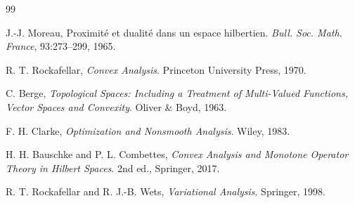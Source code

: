 \documentclass[11pt,a4paper]{article}
\begin{document}
\begin{thebibliography}{99}

J.-J. Moreau,
\newblock Proximité et dualité dans un espace hilbertien.
\newblock \emph{Bull. Soc. Math. France}, 93:273--299, 1965.

R. T. Rockafellar,
\newblock \emph{Convex Analysis}.
\newblock Princeton University Press, 1970.

C. Berge,
\newblock \emph{Topological Spaces: Including a Treatment of Multi-Valued Functions, Vector Spaces and Convexity}.
\newblock Oliver \& Boyd, 1963.

F. H. Clarke,
\newblock \emph{Optimization and Nonsmooth Analysis}.
\newblock Wiley, 1983.

H. H. Bauschke and P. L. Combettes,
\newblock \emph{Convex Analysis and Monotone Operator Theory in Hilbert Spaces}.
\newblock 2nd ed., Springer, 2017.

R. T. Rockafellar and R. J.-B. Wets,
\newblock \emph{Variational Analysis}.
\newblock Springer, 1998.

\end{thebibliography}
\end{document}
